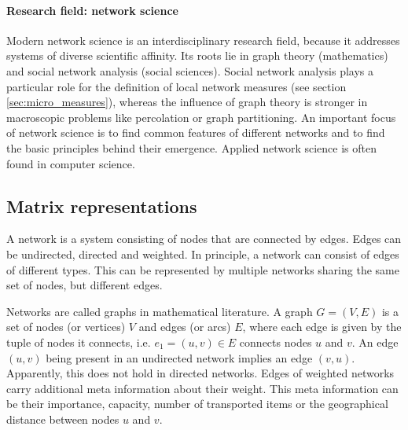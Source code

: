 \paragraph{Research field: network science\color{Cayenne}{.}}
Modern network science is an interdisciplinary research field, because it addresses systems of diverse scientific affinity.
Its roots lie in graph theory (mathematics) and social network analysis (social sciences).
Social network analysis plays a particular role for the definition of local network measures (see section \ref{sec:micro_measures}), whereas the influence of graph theory is stronger in macroscopic problems like percolation or graph partitioning.
An important focus of network science is to find common features of different networks and to find the basic principles behind their emergence.
Applied network science is often found in computer science.

\subsection{Matrix representations}\label{sec:network_matrices}
A network is a system consisting of nodes that are connected by edges.
Edges can be undirected, directed and weighted.
In principle, a network can consist of edges of different types.
This can be represented by multiple networks sharing the same set of nodes, but different edges.

Networks are called graphs in mathematical literature.
A graph $G=(V,E)$ is a set of nodes (or vertices) $V$ and edges (or arcs) $E$, where each edge is given by the tuple of nodes it connects, i.e. $e_1 =(u,v) \in E$ connects nodes $u$ and $v$.
An edge $(u,v)$ being present in an undirected network implies an edge $(v,u)$.
Apparently, this does not hold in directed networks.
Edges of weighted networks carry additional meta information about their weight.
This meta information can be their importance, capacity, number of transported items or the geographical distance between nodes $u$ and $v$.


